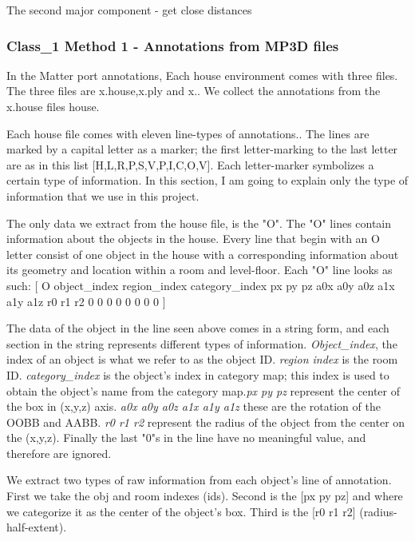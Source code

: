 The second major component - get close distances 


\subsubsection{Class_1 Method 1 - Annotations from MP3D files}

In the Matter port annotations, Each house environment comes with three files. The three files are x.house,x.ply and x.. We collect the annotations from the x.house files house. 

Each house file comes with eleven line-types of annotations.. The lines are marked by a capital letter as a marker; the first letter-marking to the last letter are as in this list [H,L,R,P,S,V,P,I,C,O,V]. Each letter-marker symbolizes a certain type of information. In this section, I am going to explain only the type of information that we use in this project.

The only data we extract from the house file, is the "O". The "O" lines contain information about the objects in the house. Every line that begin with an O letter consist of one object in the house with a corresponding information about its geometry and location within a room and level-floor. Each "O" line looks as such: [ O object\_index region\_index category\_index px py pz  a0x a0y a0z  a1x a1y a1z  r0 r1 r2 0 0 0 0 0 0 0 0 ] 

The data of the object in the line seen above comes in a string form, and each section in the string represents different types of information. \textit{Object\_index}, the index of an object is what we refer to as the object ID. \textit{region index} is the room ID. \textit{category\_index} is the object's index in category map; this index is used to obtain the object's name from the category map.\textit{px py pz} represent the center of the box in (x,y,z) axis. \textit{a0x a0y a0z  a1x a1y a1z} these are the rotation of the OOBB and AABB. \textit{r0 r1 r2} represent the radius of the object from the center on the (x,y,z). Finally the last "0"s in the line have no meaningful value, and therefore are ignored. 

We extract two types of raw information from each object's line of annotation. First we take the obj and room indexes (ids). Second is the [px py pz] and where we categorize it as the center of the object's box. Third is the [r0 r1 r2] (radius-half-extent).


